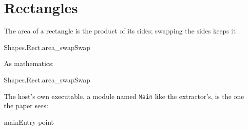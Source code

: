 \documentclass{article}
\begin{document}
\section{Rectangles}

The area of a rectangle is the product of its sides; swapping the sides
keeps it .

\begin{leanblock}{Shapes.Rect.area_swap}{Swap}
\end{leanblock}

As mathematics:
\begin{leanblock}[view=math]{Shapes.Rect.area_swap}{Swap}
\end{leanblock}

The host's own executable, a module named \texttt{Main} like the
extractor's, is the one the paper sees:
\begin{leanblock}[view=lean]{main}{Entry point}
\end{leanblock}
\end{document}
